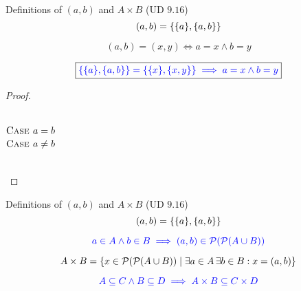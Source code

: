 \begin{frame}{}
  \begin{exampleblock}{Definitions of $(a,b)$ and $A \times B$ (UD $9.16$)}
    \[
      (a, b) = \{\{a\}, \{a,b\}\}
    \]

    \[
      (a,b) = (x,y) \iff a = x \land b = y
    \]
  \end{exampleblock}

  \[
    \boxed{\textcolor{blue}{\{\{a\}, \{a,b\}\} = \{\{x\}, \{x,y\}\} \implies a = x \land b = y}}
  \]

  \vspace{0.50cm}
  \begin{proof}
    \begin{columns}[t]
        \[
	  \textsc{Case } a = b
	\]
	\uncover<2->{
	  \[
	    \teal{(a,a) = \set{\set{a}}}
	  \]
	}
        \[
	  \textsc{Case } a \neq b
	\]
	\uncover<3->{
	  \[
	    \teal{\set{a} = \set{x} \quad \set{a,b} = \set{x,y}}
	  \]
	}
    \end{columns}
  \end{proof}
\end{frame}

\begin{frame}{}
  \begin{exampleblock}{Definitions of $(a,b)$ and $A \times B$ (UD $9.16$)}
    \[
      (a, b) = \{\{a\}, \{a,b\}\}
    \]

    \[
      \textcolor{blue}{a \in A \land b \in B \implies (a, b) \in \mathcal{P}(\mathcal{P}(A \cup B))}
    \]

    \pause
    \[
      A \times B = \{x \in \mathcal{P}(\mathcal{P}(A \cup B)) \mid \exists a \in A \,\exists b \in B : x = (a,b)\}
    \]

    \[
      \textcolor{blue}{A \subseteq C \land B \subseteq D \implies A \times B \subseteq C \times D}
    \]
  \end{exampleblock}
\end{frame}

